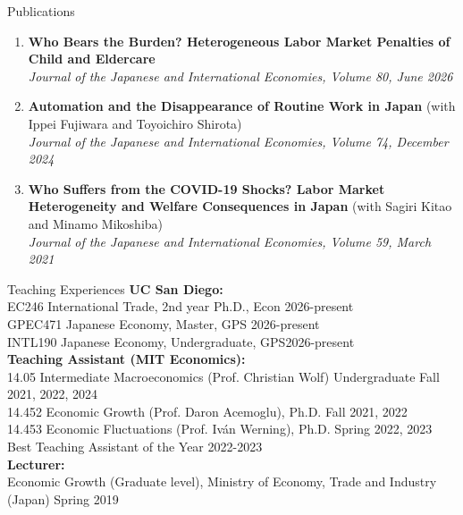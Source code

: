 \documentclass{resume} %
\begin{document}
\begin{rSection}{Publications}
\begin{enumerate}
    \item \textbf{Who Bears the Burden? Heterogeneous Labor Market Penalties of Child and Eldercare} \\
     \textit{Journal of the Japanese and International Economies, Volume 80, June 2026} 
    \item \textbf{Automation and the Disappearance of Routine Work in Japan} (with Ippei Fujiwara and Toyoichiro Shirota)\\
    \textit{Journal of the Japanese and International Economies, Volume 74, December 2024}  
    \item \textbf{Who Suffers from the COVID-19 Shocks? Labor Market Heterogeneity and Welfare Consequences in Japan} (with Sagiri Kitao and Minamo Mikoshiba) \\
    \textit{Journal of the Japanese and International Economies, Volume 59, March 2021}
    \end{enumerate}
\end{rSection}

\begin{rSection}{Teaching Experiences}
\textbf{UC San Diego:}\\
EC246 International Trade, 2nd year Ph.D., Econ \hfill 2026-present\\
GPEC471 Japanese Economy, Master, GPS \hfill 2026-present\\
INTL190 Japanese Economy, Undergraduate, GPS\hfill 2026-present\\
\textbf{Teaching Assistant (MIT Economics):}\\
14.05 Intermediate Macroeconomics (Prof. Christian Wolf) Undergraduate  \hfill Fall 2021, 2022, 2024\\
14.452 Economic Growth (Prof. Daron Acemoglu), Ph.D. \hfill Fall 2021, 2022\\
14.453 Economic Fluctuations (Prof. Iván Werning), Ph.D. \hfill Spring 2022, 2023\\
Best Teaching Assistant of the Year \hfill 2022-2023\\
\textbf{Lecturer:}\\
Economic Growth (Graduate level), Ministry of Economy, Trade and Industry (Japan) \hfill Spring 2019
\end{rSection}
\end{document}
